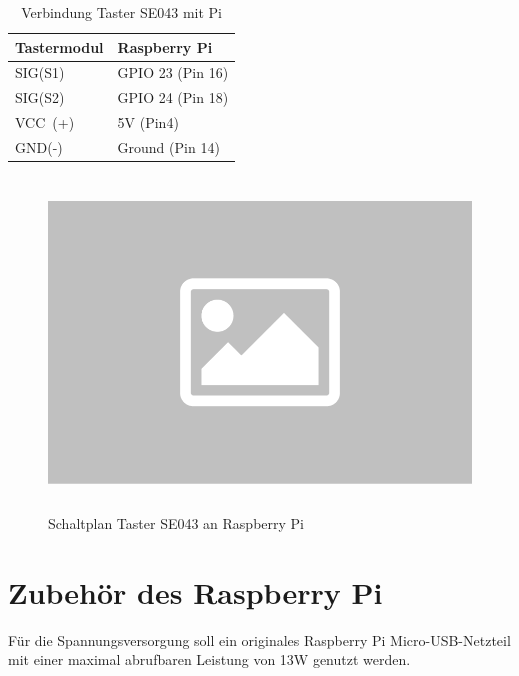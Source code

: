 \documentclass[12pt,a4paper,openany]{scrbook}
\begin{document}
\begin{table}[H]
	\centering
	\begin{tabular}{|p{5cm}|p{5cm}|} 
		\hline
		Tastermodul & Raspberry Pi  \\ 
		\hline
		SIG(S1)                   & GPIO 23 \hspace{0,3cm}(Pin 16)               \\ 
		\hline
		SIG(S2)                   & GPIO 24 \hspace{0,3cm}(Pin 18)           \\
		\hline
		VCC~(+)   & 5V \hspace{1,45cm}(Pin\hspace{0,35cm}4)            \\ 
		\hline
		GND(-)                   & Ground \hspace{0,6cm}(Pin 14)           \\
		\hline
		
\end{tabular}
	\caption{Verbindung Taster SE043 mit Pi} 
\end{table}




	\begin{figure}[H]
	\centering
	\includegraphics[height=250pt]{img/platzhalter}
	\caption{Schaltplan Taster SE043 an Raspberry Pi}
	\label{Bildlabel}
\end{figure}

\section{Zubehör des Raspberry Pi}

Für die Spannungsversorgung soll ein originales Raspberry Pi Micro-USB-Netzteil mit einer maximal abrufbaren Leistung von 13W genutzt werden.\\[0,5cm]
\end{document}
